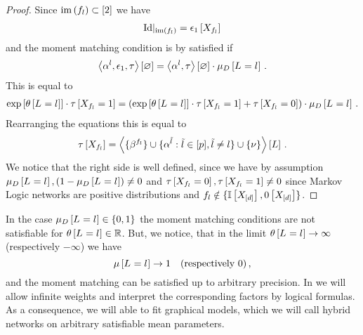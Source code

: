 \begin{proof}
    Since $\mathrm{im}\left(f_{l}\right)\subset[2]$ we have
    \begin{align*}
        {\mathrm{Id}}|_{\mathrm{im}\left(f_{l}\right)} = \epsilon_{1}\left[X_{f_{l}}\right]
    \end{align*}
    and the moment matching condition is by  satisfied if
    \begin{align*}
        \left\langle \alpha^{l}, \epsilon_{1}, \tau\right\rangle \left[ \varnothing \right]
        = \left\langle \alpha^{l},\tau\right\rangle \left[ \varnothing \right] \cdot \mu_{D}\left[L_{}=l_{}\right] \, .
    \end{align*}
    This is equal to
    \begin{align*}
        \mathrm{exp}\left[\theta\left[L_{}=l_{}\right]\right] \cdot \tau\left[X_{f_{l}}=1\right]
        = \left( \mathrm{exp}\left[\theta\left[L_{}=l_{}\right]\right] \cdot \tau\left[X_{f_{l}}=1\right] + \tau\left[X_{f_{l}}=0\right] \right) \cdot \mu_{D}\left[L_{}=l_{}\right] \, .
    \end{align*}
    Rearranging the equations this is equal to
    \begin{align*}
        \tau\left[X_{f_{l}}\right]
        = \left\langle \{\beta^{f_{l}}\}
        \cup\{\alpha^{\tilde{l}} : \tilde{l} \in [p], \tilde{l}\neq l\}
        \cup\{\nu\}\right\rangle \left[ L \right] \, .
    \end{align*}
    We notice that the right side is well defined, since we have by assumption $\mu_{D}\left[L_{}=l_{}\right], (1- \mu_{D}\left[L_{}=l_{}\right]) \neq 0$ and $\tau\left[X_{f_{l}}=0\right], \tau\left[X_{f_{l}}=1\right] \neq 0$ since Markov Logic networks are positive distributions and $f_{l} \notin \{\mathbb{I}\left[X_{[d]}\right],0\left[X_{[d]}\right]\}$.
\end{proof}



In the case $\mu_{D}\left[L_{}=l_{}\right]\in\{0,1\}$ the moment matching conditions are not satisfiable for $\theta\left[L_{}=l_{}\right]\in\mathbb{R}$.
But, we notice, that in the limit $\theta\left[L_{}=l_{}\right]\rightarrow \infty $ (respectively $-\infty$) we have
\[ \mu\left[L_{}=l_{}\right] \rightarrow  1 \quad \text{(respectively $0$)}\, ,  \]
and the moment matching can be satisfied up to arbitrary precision.
In  we will allow infinite weights and interpret the corresponding factors by logical formulas.
As a consequence, we will able to fit graphical models, which we will call hybrid networks on arbitrary satisfiable mean parameters.

